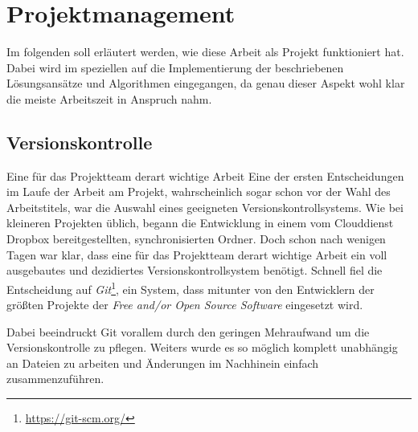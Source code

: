 \section{Projektmanagement}

Im folgenden soll erläutert werden, wie diese Arbeit als Projekt funktioniert hat. Dabei wird im speziellen auf die Implementierung der beschriebenen Lösungsansätze und Algorithmen eingegangen, da genau dieser Aspekt wohl klar die meiste Arbeitszeit in Anspruch nahm. 

\subsection{Versionskontrolle}
Eine für das Projektteam derart wichtige Arbeit 
Eine der ersten Entscheidungen im Laufe der Arbeit am Projekt, wahrscheinlich sogar schon vor der Wahl des Arbeitstitels, war die Auswahl eines geeigneten Versionskontrollsystems. Wie bei kleineren Projekten üblich, begann die Entwicklung in einem vom Clouddienst Dropbox bereitgestellten, synchronisierten Ordner. Doch schon nach wenigen Tagen war klar, dass eine für das Projektteam derart wichtige Arbeit ein voll ausgebautes und dezidiertes Versionskontrollsystem benötigt. Schnell fiel die Entscheidung auf \textit{Git}\footnote{\url{https://git-scm.org/}}, ein System, dass mitunter von den Entwicklern der größten Projekte der \textit{Free and/or Open Source Software} eingesetzt wird.

Dabei beeindruckt Git vorallem durch den geringen Mehraufwand um die Versionskontrolle zu pflegen. Weiters wurde es so möglich komplett unabhängig an Dateien zu arbeiten und Änderungen im Nachhinein einfach zusammenzuführen.
